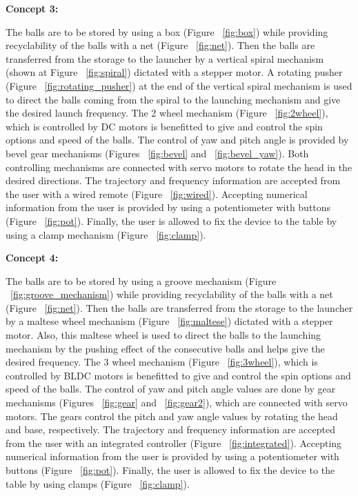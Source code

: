 \documentclass[12pt]{article}
\begin{document}
    \textbf{Concept 3:}

    The balls are to be stored by using a box (Figure ~\ref{fig:box}) while providing recyclability of the balls with a net (Figure ~\ref{fig:net}). Then the balls are transferred from the storage to the launcher by a vertical spiral mechanism (shown at Figure ~\ref{fig:spiral}) dictated with a stepper motor. A rotating pusher (Figure ~\ref{fig:rotating_pusher}) at the end of the vertical spiral mechanism is used to direct the balls coming from the spiral to the launching mechanism and give the desired launch frequency. The 2 wheel mechanism (Figure ~\ref{fig:2wheel}), which is controlled by DC motors is benefitted to give and control the spin options and speed of the balls. The control of yaw and pitch angle is provided by bevel gear mechanisms (Figures ~\ref{fig:bevel} and ~\ref{fig:bevel_yaw}). Both controlling mechanisms are connected with servo motors to rotate the head in the desired directions. The trajectory and frequency information are accepted from the user with a wired remote (Figure ~\ref{fig:wired}). Accepting numerical information from the user is provided by using a potentiometer with buttons (Figure ~\ref{fig:pot}). Finally, the user is allowed to fix the device to the table by using a clamp mechanism (Figure ~\ref{fig:clamp}).

    \textbf{Concept 4:}

    The balls are to be stored by using a groove mechanism (Figure ~\ref{fig:groove_mechanism}) while providing recyclability of the balls with a net (Figure ~\ref{fig:net}). Then the balls are transferred from the storage to the launcher by a maltese wheel mechanism (Figure ~\ref{fig:maltese}) dictated with a stepper motor. Also, this maltese wheel is used to direct the balls to the launching mechanism by the pushing effect of the consecutive balls and helps give the desired frequency. The 3 wheel mechanism (Figure ~\ref{fig:3wheel}), which is controlled by BLDC motors is benefitted to give and control the spin options and speed of the balls. The control of yaw and pitch angle values are done by gear mechanisms (Figures ~\ref{fig:gear} and ~\ref{fig:gear2}), which are connected with servo motors. The gears control the pitch and yaw angle values by rotating the head and base, respectively. The trajectory and frequency information are accepted from the user with an integrated controller (Figure ~\ref{fig:integrated}). Accepting numerical information from the user is provided by using a potentiometer with buttons (Figure ~\ref{fig:pot}). Finally, the user is allowed to fix the device to the table by using clamps (Figure ~\ref{fig:clamp}).
\end{document}
